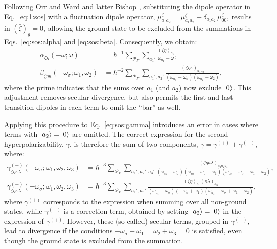 \documentclass[12pt,a4paper]{article}
\begin{document}
Following Orr and Ward \cite{orrPerturbationTheoryNonlinear1971} and latter Bishop \cite{bishopExplicitNondivergentFormulas1994}, substituting the dipole operator in Eq.~\eqref{eq:1:sos} with a fluctuation dipole operator, $\bar{\mu}^\zeta_{a_1 a_2} = \mu^\zeta_{a_1 a_2} - \delta_{a_1 a_2}\, \mu_{00}^\zeta$, results in $(\bar{\zeta})_g = 0$, allowing the ground state to be excluded from the summations in Eqs.~\eqref{eq:sos:alpha} and \eqref{eq:sos:beta}. Consequently, we obtain:
\begin{align*}
	\alpha_{\zeta\eta}(-\omega; \omega) &= \hbar^{-1} \sum_{\mathcal{P}_F} \sum_{a_1'} \frac{(\zeta\eta)_{a_1}}{\omega_{a_1} - \omega},\\
	\beta_{\zeta\eta\kappa}(-\omega_\sigma; \omega_1, \omega_2) &= \hbar^{-2} \sum_{\mathcal{P}_F} \sum_{a_1', a_2'} \frac{(\zeta\bar{\eta}\kappa)_{a_1 a_2}}{(\omega_{a_1} - \omega_\sigma)(\omega_{a_2} - \omega_2)},
\end{align*}
where the prime indicates that the sums over $a_1$ (and $a_2$) now exclude $\ket{0}$. This adjustment removes secular divergence, but also permits the first and last transition dipoles in each term to omit the ``bar'' as well.

Applying this procedure to Eq.~\eqref{eq:sos:gamma} introduces an error in cases where terms with $\ket{a_2} = \ket{0}$ are omitted. The correct expression for the second hyperpolarizability, $\gamma$, is therefore the sum of two components, $\gamma = \gamma^{(+)} + \gamma^{(-)}$, where:
\begin{align}
	\gamma_{\zeta\eta\kappa\lambda}^{(+)}(-\omega_\sigma; \omega_1, \omega_2, \omega_3) &= \hbar^{-3} \sum_{\mathcal{P}_F} \sum_{a_1', a_2', a_3'} \frac{(\zeta \bar{\eta} \bar{\kappa} \lambda)_{a_1 a_2 a_3}}{(\omega_{a_1} - \omega_\sigma)(\omega_{a_2} - \omega_\sigma + \omega_1)(\omega_{a_3} - \omega_\sigma + \omega_1 + \omega_2)}, \nonumber\\
	\gamma_{\zeta\eta\kappa\lambda}^{(-)}(-\omega_\sigma; \omega_1, \omega_2, \omega_3) &= \hbar^{-3} \sum_{\mathcal{P}_F} \sum_{a_1', a_3'} \frac{(\zeta \eta)_{a_1} (\kappa \lambda)_{a_3}}{(\omega_{a_1} - \omega_\sigma)(-\omega_\sigma + \omega_1)(\omega_{a_3} - \omega_\sigma + \omega_1 + \omega_2)},
	\label{eq:fluct:gamma}
\end{align}
where $\gamma^{(+)}$ corresponds to the expression when summing over all non-ground states, while $\gamma^{(-)}$ is a correction term, obtained by setting $\ket{a_2} = \ket{0}$ in the expression of $\gamma^{(+)}$. However, these (so-called) secular terms, grouped in $\gamma^{(-)}$, lead to divergence if the conditions $-\omega_\sigma + \omega_1 = \omega_2 + \omega_3 = 0$ is satisfied, even though the ground state is excluded from the summation.
\end{document}
